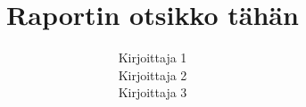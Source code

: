 \documentclass{watson}
\title{Raportin otsikko tähän}
\author{Kirjoittaja 1\\
        Kirjoittaja 2\\
        Kirjoittaja 3}
\begin{document}
\maketitle
\tableofcontents
\newpage





\newpage
\begin{appendix}
  
\end{appendix}


\newpage
\printbibliography
\end{document}
